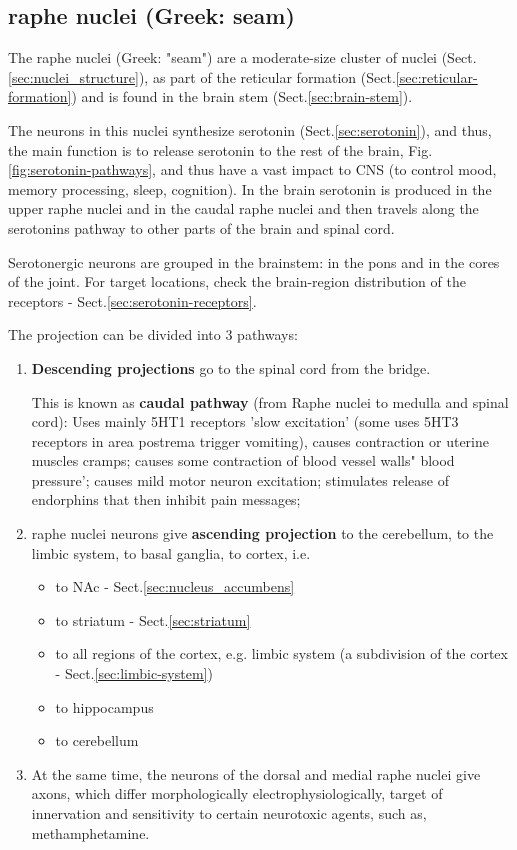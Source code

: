 \subsection{raphe nuclei (Greek: seam)}
\label{sec:raphe-nuclei}

The raphe nuclei (Greek: "seam") are a moderate-size cluster of nuclei
(Sect.\ref{sec:nuclei_structure}), as part of the reticular formation
(Sect.\ref{sec:reticular-formation}) and is found in the brain stem
(Sect.\ref{sec:brain-stem}).

The neurons in this nuclei synthesize serotonin (Sect.\ref{sec:serotonin}), and
thus, the main function is to release serotonin to the rest of the brain,
Fig.\ref{fig:serotonin-pathways}, and thus have a vast impact to CNS (to control
mood, memory processing, sleep, cognition). In the brain serotonin is produced
in the upper raphe nuclei and in the caudal raphe nuclei and then travels along
the serotonins pathway to other parts of the brain and spinal cord.

Serotonergic neurons are grouped in the brainstem: in the pons and in the cores
of the joint. For target locations, check
the brain-region distribution of the receptors -
Sect.\ref{sec:serotonin-receptors}.

The projection can be divided into 3 pathways:
\begin{enumerate}
  \item  {\bf Descending projections} go to the spinal cord from the bridge.
  
  This is known as {\bf caudal pathway} (from Raphe nuclei to medulla and spinal
  cord): Uses mainly 5HT1 receptors 'slow excitation' (some uses 5HT3 receptors
  in area postrema trigger vomiting), causes contraction or uterine muscles
  cramps; causes some contraction of blood vessel walls" blood pressure'; causes
  mild motor neuron excitation; stimulates release of endorphins that then
  inhibit pain messages;
  
  \item raphe nuclei neurons give {\bf ascending projection} to the cerebellum,
  to the limbic system, to basal ganglia, to cortex, i.e.
\begin{itemize}
  \item to NAc - Sect.\ref{sec:nucleus_accumbens}
  \item to striatum - Sect.\ref{sec:striatum}
  \item to all regions of the cortex, e.g. limbic system (a subdivision of the
  cortex - Sect.\ref{sec:limbic-system})
  \item to hippocampus
  \item to cerebellum
\end{itemize}

  \item At the same time, the neurons of the dorsal and medial raphe nuclei give
 axons, which differ morphologically electrophysiologically, target of innervation and
sensitivity to certain neurotoxic agents, such as, methamphetamine. 
\end{enumerate}

